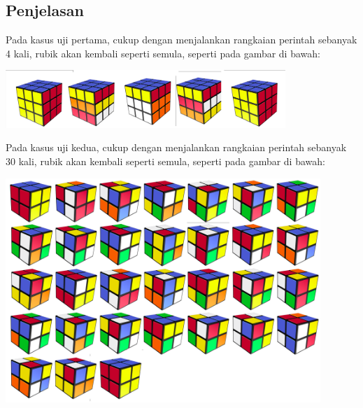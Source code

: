 \documentclass{article}
\begin{document}
\subsection*{Penjelasan}
Pada kasus uji pertama, cukup dengan menjalankan rangkaian perintah sebanyak 4 kali, rubik akan kembali seperti semula, seperti pada gambar di bawah:
\begin{center}
\includegraphics[width=400px]{sample-1}
\end{center}
Pada kasus uji kedua, cukup dengan menjalankan rangkaian perintah sebanyak 30 kali, rubik akan kembali seperti semula, seperti pada gambar di bawah:
\begin{center}
\includegraphics[width=450px]{sample-2}
\end{center}
\pagebreak
\end{document}
